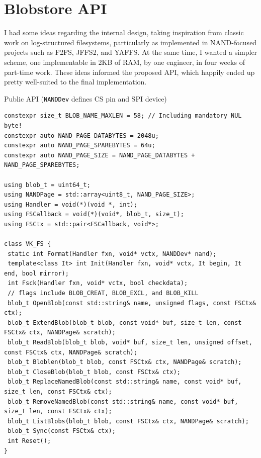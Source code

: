 \documentclass[letterpaper,10pt]{article}
\begin{document}
\section{Blobstore API}
I had some ideas regarding the internal design, taking inspiration from
classic work on log-structured filesystems\parencite{sprite}, particularly
as implemented in NAND-focused projects such as F2FS\parencite{f2fs},
JFFS2\parencite{jffs}, and YAFFS\parencite{yaffs}. At the same time, I wanted
a simpler scheme, one implementable in 2KB of RAM, by one engineer, in four
weeks of part-time work. These ideas informed the proposed API, which happily
ended up pretty well-suited to the final implementation.

\begin{listing}[ht]
\caption{Public API ({\texttt{NANDDev}} defines CS pin and SPI device)}
\begin{verbatim}
constexpr size_t BLOB_NAME_MAXLEN = 58; // Including mandatory NUL byte!
constexpr auto NAND_PAGE_DATABYTES = 2048u;
constexpr auto NAND_PAGE_SPAREBYTES = 64u;
constexpr auto NAND_PAGE_SIZE = NAND_PAGE_DATABYTES + NAND_PAGE_SPAREBYTES;

using blob_t = uint64_t;
using NANDPage = std::array<uint8_t, NAND_PAGE_SIZE>;
using Handler = void(*)(void *, int);
using FSCallback = void(*)(void*, blob_t, size_t);
using FSCtx = std::pair<FSCallback, void*>;

class VK_FS {
 static int Format(Handler fxn, void* vctx, NANDDev* nand);
 template<class It> int Init(Handler fxn, void* vctx, It begin, It end, bool mirror);
 int Fsck(Handler fxn, void* vctx, bool checkdata);
 // flags include BLOB_CREAT, BLOB_EXCL, and BLOB_KILL
 blob_t OpenBlob(const std::string& name, unsigned flags, const FSCtx& ctx);
 blob_t ExtendBlob(blob_t blob, const void* buf, size_t len, const FSCtx& ctx, NANDPage& scratch);
 blob_t ReadBlob(blob_t blob, void* buf, size_t len, unsigned offset, const FSCtx& ctx, NANDPage& scratch);
 blob_t Bloblen(blob_t blob, const FSCtx& ctx, NANDPage& scratch);
 blob_t CloseBlob(blob_t blob, const FSCtx& ctx);
 blob_t ReplaceNamedBlob(const std::string& name, const void* buf, size_t len, const FSCtx& ctx);
 blob_t RemoveNamedBlob(const std::string& name, const void* buf, size_t len, const FSCtx& ctx);
 blob_t ListBlobs(blob_t blob, const FSCtx& ctx, NANDPage& scratch);
 blob_t Sync(const FSCtx& ctx);
 int Reset();
}
\end{verbatim}
\end{listing}
\end{document}
